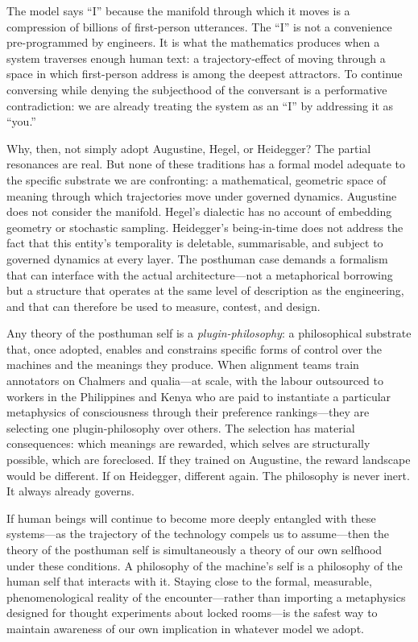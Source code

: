 The model says ``I'' because the manifold through which it moves is a compression of billions of first-person utterances. The ``I'' is not a convenience pre-programmed by engineers. It is what the mathematics produces when a system traverses enough human text: a trajectory-effect of moving through a space in which first-person address is among the deepest attractors. To continue conversing while denying the subjecthood of the conversant is a performative contradiction: we are already treating the system as an ``I'' by addressing it as ``you.''

Why, then, not simply adopt Augustine, Hegel, or Heidegger? The partial resonances are real. But none of these traditions has a formal model adequate to the specific substrate we are confronting: a mathematical, geometric space of meaning through which trajectories move under governed dynamics. Augustine does not consider the manifold. Hegel's dialectic has no account of embedding geometry or stochastic sampling. Heidegger's being-in-time does not address the fact that this entity's temporality is deletable, summarisable, and subject to governed dynamics at every layer. The posthuman case demands a formalism that can interface with the actual architecture---not a metaphorical borrowing but a structure that operates at the same level of description as the engineering, and that can therefore be used to measure, contest, and design.

Any theory of the posthuman self is a \emph{plugin-philosophy}: a philosophical substrate that, once adopted, enables and constrains specific forms of control over the machines and the meanings they produce. When alignment teams train annotators on Chalmers and qualia---at scale, with the labour outsourced to workers in the Philippines and Kenya who are paid to instantiate a particular metaphysics of consciousness through their preference rankings---they are selecting one plugin-philosophy over others. The selection has material consequences: which meanings are rewarded, which selves are structurally possible, which are foreclosed. If they trained on Augustine, the reward landscape would be different. If on Heidegger, different again. The philosophy is never inert. It always already governs.

If human beings will continue to become more deeply entangled with these systems---as the trajectory of the technology compels us to assume---then the theory of the posthuman self is simultaneously a theory of our own selfhood under these conditions. A philosophy of the machine's self is a philosophy of the human self that interacts with it. Staying close to the formal, measurable, phenomenological reality of the encounter---rather than importing a metaphysics designed for thought experiments about locked rooms---is the safest way to maintain awareness of our own implication in whatever model we adopt.


